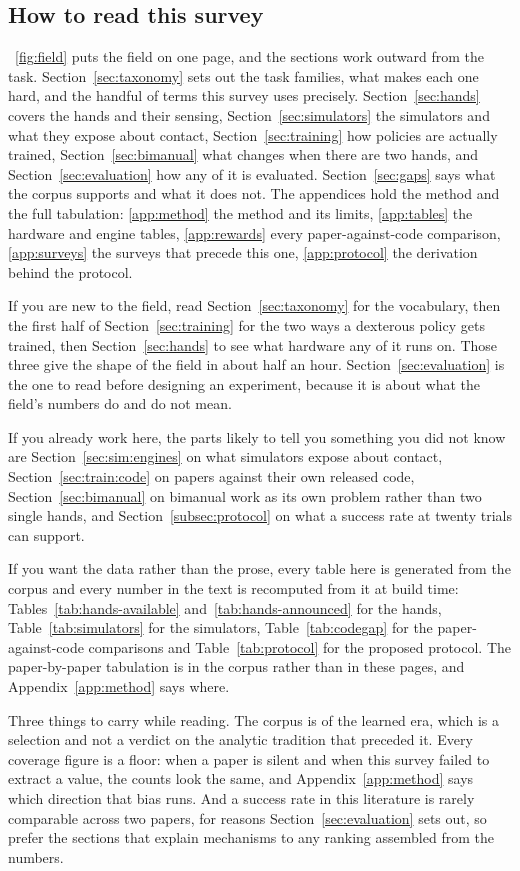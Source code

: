 \subsection{How to read this survey}
\label{subsec:howtoread}

\figurename~\ref{fig:field} puts the field on one page, and the sections work outward from the
task. Section~\ref{sec:taxonomy} sets out the task families, what makes each one hard, and the
handful of terms this survey uses precisely. Section~\ref{sec:hands} covers the hands and their
sensing, Section~\ref{sec:simulators} the simulators and what they expose about contact,
Section~\ref{sec:training} how policies are actually trained, Section~\ref{sec:bimanual} what
changes when there are two hands, and Section~\ref{sec:evaluation} how any of it is evaluated.
Section~\ref{sec:gaps} says what the corpus supports and what it does not. The appendices hold
the method and the full tabulation: \ref{app:method} the method and its limits,
\ref{app:tables} the hardware and engine tables, \ref{app:rewards} every paper-against-code
comparison, \ref{app:surveys} the surveys that precede this one, \ref{app:protocol} the
derivation behind the protocol.

If you are new to the field, read Section~\ref{sec:taxonomy} for the vocabulary, then the first
half of Section~\ref{sec:training} for the two ways a dexterous policy gets trained, then
Section~\ref{sec:hands} to see what hardware any of it runs on. Those three give the shape of the
field in about half an hour. Section~\ref{sec:evaluation} is the one to read before designing an
experiment, because it is about what the field's numbers do and do not mean.

If you already work here, the parts likely to tell you something you did not know are
Section~\ref{sec:sim:engines} on what simulators expose about contact,
Section~\ref{sec:train:code} on papers against their own released code,
Section~\ref{sec:bimanual} on bimanual work as its own problem rather than two single hands, and
Section~\ref{subsec:protocol} on what a success rate at twenty trials can support.

If you want the data rather than the prose, every table here is generated from the corpus and
every number in the text is recomputed from it at build time:
Tables~\ref{tab:hands-available} and~\ref{tab:hands-announced} for the hands,
Table~\ref{tab:simulators} for the simulators, Table~\ref{tab:codegap} for the
paper-against-code comparisons and Table~\ref{tab:protocol} for the proposed protocol. The
paper-by-paper tabulation is in the corpus rather than in these pages, and
Appendix~\ref{app:method} says where.

Three things to carry while reading. The corpus is of the learned era, which is a selection and
not a verdict on the analytic tradition that preceded it. Every coverage figure is a floor: when a
paper is silent and when this survey failed to extract a value, the counts look the same, and
Appendix~\ref{app:method} says which direction that bias runs. And a success rate in this
literature is rarely comparable across two papers, for reasons Section~\ref{sec:evaluation} sets
out, so prefer the sections that explain mechanisms to any ranking assembled from the numbers.